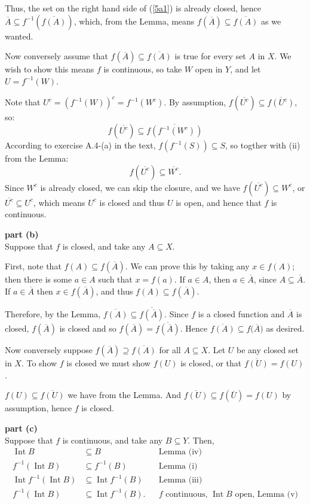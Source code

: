 \documentclass{homework}
\DeclareMathOperator{\Int}{\mathrm{Int}}
\begin{document}
Thus, the set on the right
hand side of (\ref{5a1}) is already closed, hence
$\overline{A}\subseteq f^{-1}(\overline{f(A)})$, which, from the Lemma, means
$f(\overline{A})\subseteq \overline{f(A)}$ as we wanted.

Now conversely assume that $f(\overline{A})\subseteq \overline{f(A)}$ is true
for every set $A$ in $X$.  We wish to show this means $f$ is continuous, so
take $W$ open in $Y$, and let $U=f^{-1}(W)$.

Note that $U^c=(f^{-1}(W))^c=f^{-1}(W^c)$.  By assumption,
$f(\overline{U^c})\subseteq\overline{f(U^c)}$, so:
$$ f(\overline{U^c})\subseteq \overline{f(f^{-1}(W^c))} $$
According to exercise A.4-(a) in the text, $f(f^{-1}(S))\subseteq S$, so
togther with (ii) from the Lemma:
$$ f(\overline{U^c})\subseteq \overline{W^c}. $$
Since $W^c$ is already closed, we can skip the closure, and we
have $f(\overline{U^c})\subseteq W^c$, or $\overline{U^c}\subseteq U^c$,
which means $U^c$ is closed and thus $U$ is open, and hence that $f$ is
continuous.

\textbf{part (b)}\\
Suppose that $f$ is closed, and take any $A\subseteq X$.

First, note that $f(A)\subseteq f(\overline{A})$.  We can prove this by
taking any $x\in f(A)$; then there is some $a\in A$ such that $x=f(a)$.
If $a\in A$, then $a\in\overline{A}$, since
$A\subseteq\overline{A}$.  If $a\in\overline{A}$ then $x\in f(\overline{A})$,
and thus $f(A)\subseteq f(\overline{A})$.

Therefore, by the Lemma, $\overline{f(A)}\subseteq\overline{f(\overline{A})}$.
Since $f$ is a closed function and $\overline{A}$ is closed,
$f(\overline{A})$ is closed and so
$f(\overline{A})=\overline{f(\overline{A})}$.  Hence
$\overline{f(A)}\subseteq f({\overline{A})}$ as desired.

Now conversely suppose $f(\overline{A})\supseteq\overline{f(A)}$ for all
$A\subseteq X$.  Let $U$ be any closed set in $X$.  To show $f$ is closed
we must show $f(U)$ is closed, or that $\overline{f(U)}=f(U)$.

$f(U)\subseteq \overline{f(U)}$ we have from the Lemma.  And
$\overline{f(U)}\subseteq f(\overline{U})=f(U)$ by assumption, hence $f$
is closed.

\textbf{part (c)}\\
Suppose that $f$ is continuous, and take any $B\subseteq Y$.  Then,
\begin{align*}
\Int B &\subseteq B && \text{Lemma (iv)}\\
f^{-1}(\Int B) &\subseteq f^{-1}(B) &&\text{Lemma (i)} \\
\Int f^{-1}(\Int B) &\subseteq \Int f^{-1}(B) &&\text{Lemma (iii)} \\
f^{-1}(\Int B) &\subseteq \Int f^{-1}(B). &&\text{$f$ continuous, $\Int B$ open, Lemma (v)}
\end{align*}
\end{document}
